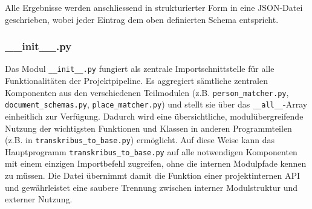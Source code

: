 \documentclass[12pt, a4paper, ngerman, bidi=default]{article}
\newcommand{\code}[1]{\colorbox{VeryLightGray}{\texttt{#1}}} %
\begin{document}
Alle Ergebnisse werden anschliessend in strukturierter Form in eine JSON-Datei geschrieben, wobei jeder Eintrag dem oben definierten Schema 
entspricht. 
\subsubsection{\_\_init\_\_.py}\label{subsec:init_module}
Das Modul \code{\_\_init\_\_.py} fungiert als zentrale Importschnittstelle für alle Funktionalitäten der Projektpipeline. Es aggregiert sämtliche zentralen Komponenten aus den verschiedenen Teilmodulen (z.B. \code{person\_matcher.py}, \code{document\_schemas.py}, \code{place\_matcher.py}) und stellt sie über das \code{\_\_all\_\_}-Array einheitlich zur Verfügung. Dadurch wird eine übersichtliche, modulübergreifende Nutzung der wichtigsten Funktionen und Klassen in anderen Programmteilen (z.B. in \code{transkribus\_to\_base.py}) ermöglicht.
Auf diese Weise kann das Hauptprogramm \code{transkribus\_to\_base.py} auf alle notwendigen Komponenten mit einem einzigen Importbefehl zugreifen, ohne die internen Modulpfade kennen zu müssen. Die Datei übernimmt damit die Funktion einer projektinternen API und gewährleistet eine saubere Trennung zwischen interner Modulstruktur und externer Nutzung. 
\end{document}
